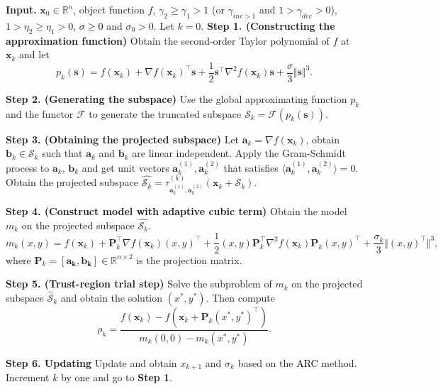 \documentclass[colorlinks=true, linkcolor=blue, citecolor=blue, urlcolor=blue]{article}
\theoremstyle{plain}
\theoremstyle{definition}
\theoremstyle{remark}
\begin{document}
\begin{algorithm}%
\caption{MD-LAMBO}
    \begin{algorithmic}[1]
   \State \textbf{Input.} $\bm x_0\in\mathbb{R}^n$, object function $f$, $\gamma_2\geq\gamma_1>1$ (or $\gamma_{inc>1}$ and $1>\gamma_{dec}>0$), $1>\eta_2\geq\eta_1>0$, \textcolor{black}{$\sigma\geq 0$} and $\sigma_0>0$. Let $k=0$.
   \State \textbf{Step 1. (Constructing the approximation function)} Obtain the second-order Taylor polynomial of $f$ at $\bm{x}_k$ and let
   \begin{equation*}p_k(\bm{s})=f(\bm{x}_k)+\nabla f(\bm{x}_k)^\top\bm{s}+\frac{1}{2}\bm{s}^\top \nabla^2f(\bm x_k)\bm{s}+\frac{\sigma}{3} \Vert \bm{s}\Vert^3.
   \end{equation*}

    \State \textbf{Step 2. (Generating the subspace)} Use the global approximating function $p_k$ and the functor $\mathcal{F}$ to generate the truncated subspace $\mathcal{S}_k=\mathcal{F}(p_k(\bm{s}))$.

    \State \textbf{Step 3. (Obtaining the projected subspace)} Let $\bm{a}_k=\nabla f(\bm{x}_k)$, obtain $\bm{b}_k\in \mathcal{S}_k$ such that $\bm a_k$ and $\bm b_k$ are linear independent. Apply the Gram-Schmidt process to $\bm a_k$, $\bm b_k$ and get unit vectors $\bm a_k^{(1)},\bm a_k^{(2)}$ that satisfies
    $\langle \bm{a}_k^{(1)},\bm{a}_k^{(2)}\rangle=0$. 
    Obtain the projected subspace $\hat{\mathcal{S}_k}=\tau_{\bm{a}_k^{(1)},\bm{a}_k^{(2)}}^{(k)}(\bm x_k+\mathcal{S}_k)$.
    
    
    \State \textbf{Step 4. (Construct model with adaptive cubic term)} Obtain the model $m_k$ on the projected subspace $\hat{\mathcal{S}_k}$.
    \begin{equation*}
        m_k(x,y)= f(\bm{x}_k)+\bm{P}_k^\top \nabla f(\bm{x}_k) (x,y)^\top+\frac{1}{2}(x,y)\bm{P}_k^\top\nabla^2f(\bm{x}_k)\bm{P}_k(x,y)^\top+\frac{\sigma_k}{3}\Vert (x,y)^\top\Vert^3,
    \end{equation*}
    where $\bm{P}_k=[\bm{a_k,\bm{b}_k}]\in\mathbb{R}^{n\times 2}$ is the projection matrix.
    
     \State \textbf{Step 5. (Trust-region trial step)} Solve the subproblem of $m_k$ on the projected subspace $\hat{\mathcal{S}}_k$ and obtain the solution $(x^*,y^*)$. Then compute
        \begin{equation*}     \rho_k=\frac{f(\bm{x}_k)-f(\bm{x}_k+\bm{P}_k (x^*,y^*)^\top)}{m_k(0,0)-m_k(x^*,y^*)}.
        \end{equation*}        

        \State \textbf{Step 6. Updating} Update and obtain $x_{k+1}$ and $\sigma_k$ based on the \textcolor{black}{ARC} method.
        Increment $k$ by one and go to \textbf{Step 1}.
    
    
    
   
    \end{algorithmic}
    \label{algo: complete algorithm}
\end{algorithm}
\end{document}
